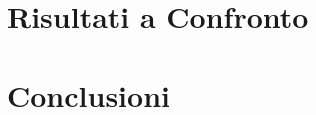 \documentclass[12pt,a4paper]{report}
\begin{document}
\chapter{Risultati a Confronto}

\chapter{Conclusioni}
\end{document}
